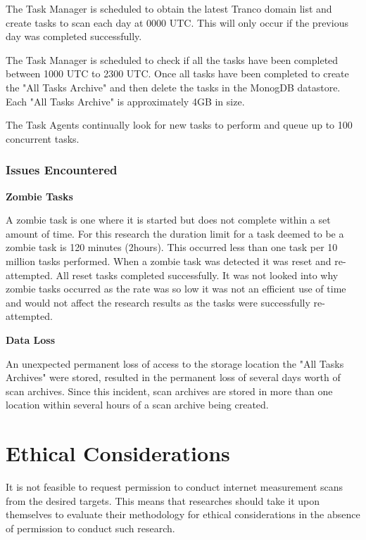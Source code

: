 \documentclass{mscreport}
\begin{document}
The Task Manager is scheduled to obtain the latest Tranco domain list and create tasks to scan each day at 0000 UTC. This will only occur if the previous day was completed successfully.

\vspace{0.3cm} \noindent
The Task Manager is scheduled to check if all the tasks have been completed between 1000 UTC to 2300 UTC. Once all tasks have been completed to create the "All Tasks Archive" and then delete the tasks in the MonogDB datastore. Each "All Tasks Archive" is approximately 4GB in size.

\vspace{0.3cm} \noindent
The Task Agents continually look for new tasks to perform and queue up to 100 concurrent tasks.

\subsubsection{Issues Encountered}

\textbf{Zombie Tasks}

\vspace{0.2cm} \noindent
A zombie task is one where it is started but does not complete within a set amount of time. For this research the duration limit for a task deemed to be a zombie task is 120 minutes (2hours). This occurred less than one task per 10 million tasks performed. When a zombie task was detected it was reset and re-attempted. All reset tasks completed successfully. It was not looked into why zombie tasks occurred as the rate was so low it was not an efficient use of time and would not affect the research results as the tasks were successfully re-attempted.

\vspace{0.6cm} \noindent
\textbf{Data Loss}

\vspace{0.2cm} \noindent
An unexpected permanent loss of access to the storage location the "All Tasks Archives" were stored, resulted in the permanent loss of several days worth of scan archives. Since this incident, scan archives are stored in more than one location within several hours of a scan archive being created.

\newpage

\section{Ethical Considerations}

It is not feasible to request permission to conduct internet measurement scans from the desired targets. This means that researches should take it upon themselves to evaluate their methodology for ethical considerations in the absence of permission to conduct such research.
\end{document}
